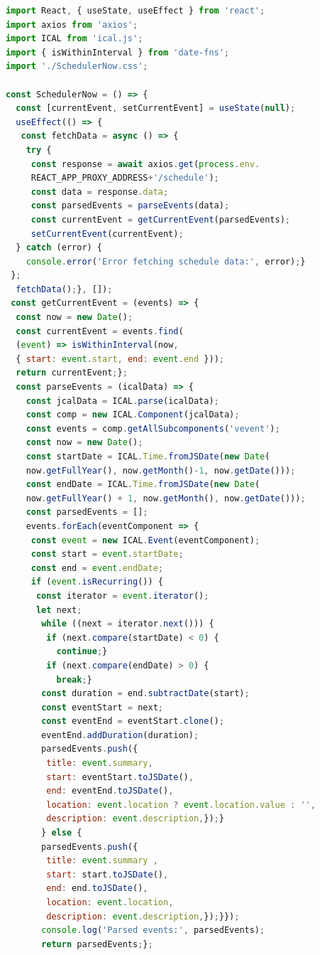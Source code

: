 \begin{lstlisting}[language=JavaScript,
	frame=single,           % Ein Rahmen um den Code
	framexleftmargin=15pt,  % Rahmen link von den Zahlen
	style=algoBericht,
	label={SchedulerNow-Komponente},
	captionpos=b ,          % Caption unter den Code setzen
	caption={SchedulerNow-Komponente}]
import React, { useState, useEffect } from 'react';
import axios from 'axios';
import ICAL from 'ical.js';
import { isWithinInterval } from 'date-fns';
import './SchedulerNow.css';

const SchedulerNow = () => {
  const [currentEvent, setCurrentEvent] = useState(null);
  useEffect(() => {
   const fetchData = async () => {
   	try {
   	 const response = await axios.get(process.env.
   	 REACT_APP_PROXY_ADDRESS+'/schedule');
   	 const data = response.data;
   	 const parsedEvents = parseEvents(data);
   	 const currentEvent = getCurrentEvent(parsedEvents);
   	 setCurrentEvent(currentEvent);
  } catch (error) {
    console.error('Error fetching schedule data:', error);}
 };
  fetchData();}, []);
 const getCurrentEvent = (events) => {
  const now = new Date();
  const currentEvent = events.find(
  (event) => isWithinInterval(now, 
  { start: event.start, end: event.end }));
  return currentEvent;};
  const parseEvents = (icalData) => {
  	const jcalData = ICAL.parse(icalData);
  	const comp = new ICAL.Component(jcalData);
  	const events = comp.getAllSubcomponents('vevent');
  	const now = new Date();
  	const startDate = ICAL.Time.fromJSDate(new Date(
  	now.getFullYear(), now.getMonth()-1, now.getDate()));
  	const endDate = ICAL.Time.fromJSDate(new Date(
  	now.getFullYear() + 1, now.getMonth(), now.getDate()));
  	const parsedEvents = [];
  	events.forEach(eventComponent => {
  	 const event = new ICAL.Event(eventComponent);
  	 const start = event.startDate;
  	 const end = event.endDate;
  	 if (event.isRecurring()) {
  	  const iterator = event.iterator();
  	  let next;
  	   while ((next = iterator.next())) {
  	   	if (next.compare(startDate) < 0) {
  	   	  continue;}
     	if (next.compare(endDate) > 0) {
     	  break;}
       const duration = end.subtractDate(start);
       const eventStart = next;
       const eventEnd = eventStart.clone();
       eventEnd.addDuration(duration);
       parsedEvents.push({
       	title: event.summary,
       	start: eventStart.toJSDate(),
       	end: eventEnd.toJSDate(),
       	location: event.location ? event.location.value : '',
       	description: event.description,});}
       } else {
       parsedEvents.push({
       	title: event.summary ,
       	start: start.toJSDate(),
       	end: end.toJSDate(),
       	location: event.location,
       	description: event.description,});}});
       console.log('Parsed events:', parsedEvents);
       return parsedEvents;};
   

\end{lstlisting}
